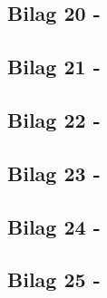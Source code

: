 \begin{appendices}
\subsection*{Bilag 20 - }\label{Bilag20}

\subsection*{Bilag 21 - }\label{Bilag21}

\subsection*{Bilag 22 - }\label{Bilag22}

\subsection*{Bilag 23 - }\label{Bilag23}

\subsection*{Bilag 24 - }\label{Bilag24}

\subsection*{Bilag 25 - }\label{Bilag25}
\end{appendices}